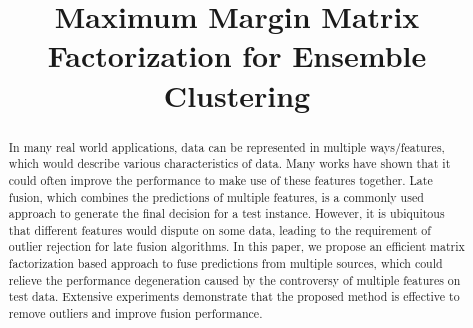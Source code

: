 \documentclass[letterpaper]{article}
\begin{document}
%



\title{Maximum Margin Matrix Factorization for Ensemble Clustering}




\maketitle



\begin{abstract}
In many real world applications, data can be represented in multiple ways/features, which would describe various characteristics of data.
Many works have shown that it could often improve the performance to make use of these features together.
Late fusion, which combines the predictions of multiple features, is a commonly used approach to generate the final decision for a test instance.
However, it is ubiquitous that different features would dispute on some data, leading to the requirement of outlier rejection for late fusion algorithms.
In this paper, we propose an efficient matrix factorization based approach to fuse predictions from multiple sources, which could
relieve the performance degeneration caused by the controversy of multiple features on test data.
Extensive experiments demonstrate that the proposed method is effective to remove outliers and improve fusion performance.
\end{abstract}
\end{document}
